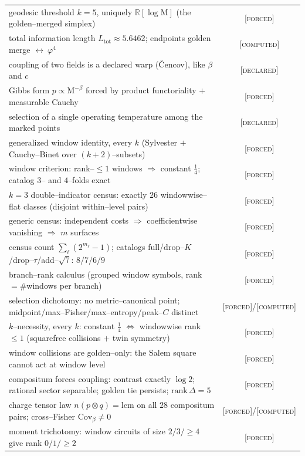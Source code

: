 \documentclass[11pt]{article}
\theoremstyle{definition}
\newcommand{\ph}{\varphi}
\newcommand{\R}{\mathbb{R}}
\newcommand{\Mah}{\mathrm{M}}
\newcommand{\forcedtag}{{\scshape [forced]}}
\newcommand{\declaredtag}{{\scshape [declared]}}
\newcommand{\computedtag}{{\scshape [computed]}}
\begin{document}
\begin{table}[h]
\begin{tabular}{lc}
geodesic threshold $k=5$, uniquely $\R[\log\Mah]$ (the golden--merged simplex) & \forcedtag\\
total information length $L_{\mathrm{tot}}\approx5.6462$; endpoints golden merge $\leftrightarrow\ \ph^4$ & \computedtag\\
coupling of two fields is a declared warp (\v{C}encov), like $\beta$ and $c$ & \declaredtag\\
Gibbs form $p\propto\Mah^{-\beta}$ forced by product functoriality $+$ measurable Cauchy & \forcedtag\\
selection of a single operating temperature among the marked points & \declaredtag\\
generalized window identity, every $k$ (Sylvester $+$ Cauchy--Binet over $(k{+}2)$--subsets) & \forcedtag\\
window criterion: rank--$\le1$ windows $\Rightarrow$ constant $\tfrac14$; catalog $3$-- and $4$--folds exact & \forcedtag\\
$k=3$ double--indicator census: exactly $26$ windowwise--flat classes (disjoint within--level pairs) & \forcedtag\\
generic census: independent costs $\Rightarrow$ coefficientwise vanishing $\Rightarrow$ $m$ surfaces & \forcedtag\\
census count $\sum_\ell(2^{m_\ell}{-}1)$; catalogs full/drop--$K$/drop--$\tau$/add--$\sqrt7$: $8/7/6/9$ & \forcedtag\\
branch--rank calculus (grouped window symbols, rank $=\#$windows per branch) & \forcedtag\\
selection dichotomy: no metric--canonical point; midpoint/max--Fisher/max--entropy/peak--$C$ distinct & \forcedtag/\computedtag\\
$k$--necessity, every $k$: constant $\tfrac14$ $\Leftrightarrow$ windowwise rank $\le1$ (squarefree collisions $+$ twin symmetry) & \forcedtag\\
window collisions are golden--only: the Salem square cannot act at window level & \forcedtag\\
compositum forces coupling: contrast exactly $\log2$; rational sector separable; golden tie persists; $\mathrm{rank}\,\Delta=5$ & \forcedtag\\
charge tensor law $n(p\otimes q)=\mathrm{lcm}$ on all $28$ compositum pairs; cross--Fisher $\mathrm{Cov}_\beta\ne0$ & \forcedtag/\computedtag\\
moment trichotomy: window circuits of size $2/3/{\ge}4$ give rank $0/1/{\ge}2$ & \forcedtag\\

\end{tabular}
\end{table}
\end{document}
